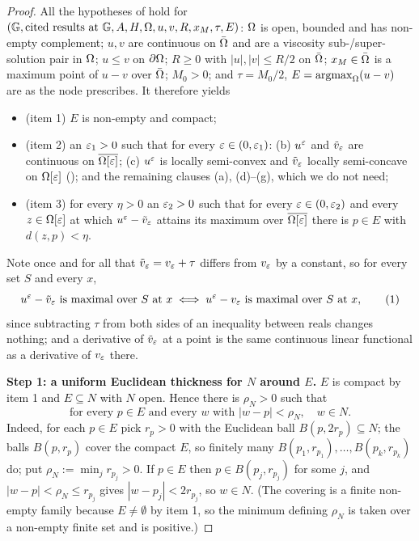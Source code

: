 \begin{proof}
All the hypotheses of  hold for
$(\mathbb G,\text{cited results at }\mathbb G,A,H,\Omega,u,v,R,x_M,\tau,E)$: $\Omega$ is open,
bounded and has
non-empty complement; $u,v$ are continuous on $\bar{\Omega}$ and are a viscosity
sub-/super-solution pair in $\Omega$; $u\le v$ on $\partial\Omega$; $R\ge0$ with $|u|,|v|\le R/2$ on
$\bar{\Omega}$; $x_M\in\bar{\Omega}$ is a maximum point of $u-v$ over $\bar{\Omega}$; $M_0>0$; and
$\tau=M_0/2$, $E=\operatorname*{argmax}_\Omega(u-v)$ are as the node prescribes. It therefore yields
\begin{itemize}
\item (item 1) $E$ is non-empty and compact;
\item (item 2) an $\varepsilon_1>0$ such that for every $\varepsilon\in(0,\varepsilon_1)$: (b) $u^{\varepsilon}$ and
  $\tilde v_{\varepsilon}$ are continuous on $\overline{\Omega[\varepsilon]}$; (c) $u^{\varepsilon}$ is locally
  semi-convex and $\tilde v_{\varepsilon}$ locally semi-concave on $\Omega[\varepsilon]$
  (); and the remaining clauses (a), (d)--(g), which we do not
  need;
\item (item 3) for every $\eta>0$ an $\varepsilon_2>0$ such that for every $\varepsilon\in(0,\varepsilon_2)$ and
  every $z\in\Omega[\varepsilon]$ at which $u^{\varepsilon}-\tilde v_{\varepsilon}$ attains its maximum over
  $\overline{\Omega[\varepsilon]}$ there is $p\in E$ with $d(z,p)<\eta$.
\end{itemize}
Note once and for all that $\tilde v_{\varepsilon}=v_{\varepsilon}+\tau$ differs from $v_{\varepsilon}$ by a
constant, so for every set $S$ and every $x$,
\[
 u^{\varepsilon}-\tilde v_{\varepsilon}\ \text{is maximal over}\ S\ \text{at}\ x
 \iff u^{\varepsilon}-v_{\varepsilon}\ \text{is maximal over}\ S\ \text{at}\ x, \tag{1}
\]
since subtracting $\tau$ from both sides of an inequality between reals changes nothing; and
a derivative of $\tilde v_\varepsilon$ at a point is the same continuous linear functional as a
derivative of $v_\varepsilon$ there.

\medskip\noindent\textbf{Step 1: a uniform Euclidean thickness for $N$ around $E$.} $E$ is
compact by item 1 and $E\subseteq N$ with $N$ open. Hence there is $\rho_N>0$ such that
\[
 \text{for every } p\in E \text{ and every } w \text{ with } |w-p|<\rho_N,\quad w\in N .
 \tag{2}
\]
Indeed, for each $p\in E$ pick $r_p>0$ with the Euclidean ball $B(p,2r_p)\subseteq N$; the
balls $B(p,r_p)$ cover the compact $E$, so finitely many $B(p_1,r_{p_1}),\ldots,B(p_k,r_{p_k})$
do; put $\rho_N:=\min_j r_{p_j}>0$. If $p\in E$ then $p\in B(p_j,r_{p_j})$ for some $j$, and
$|w-p|<\rho_N\le r_{p_j}$ gives $|w-p_j|<2r_{p_j}$, so $w\in N$. (The covering is a finite
non-empty family because $E\ne\emptyset$ by item 1, so the minimum defining $\rho_N$ is taken
over a non-empty finite set and is positive.)


\end{proof}
